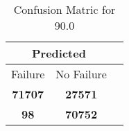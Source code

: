 \begin{table}[] 
\caption{Confusion Matric for 90.0} 
\label{Table: Prediction Accuracy-DMD90.0OnlySunEKF-combinationReflectionEKF-top2-Reflection} 
\centering 
\begin{tabular} 
 {@{}ccc@{}} 
\toprule 
\multicolumn{2}{c}{\textbf{Predicted}}
 \\ \midrule 
\multicolumn{1}{|c|}{Failure} & 
\multicolumn{1}{c|}{No Failure}
 \\ \midrule 
\multicolumn{1}{|c|}{\color{green}\textbf{71707}} & 
\multicolumn{1}{c|}{\color{red}\textbf{27571}}
 \\ \midrule 
\multicolumn{1}{|c|}{\color{red}\textbf{98}} & 
\multicolumn{1}{c|}{\color{green}\textbf{70752}}
 \\ \bottomrule 
\end{tabular} 
\end{table} 

